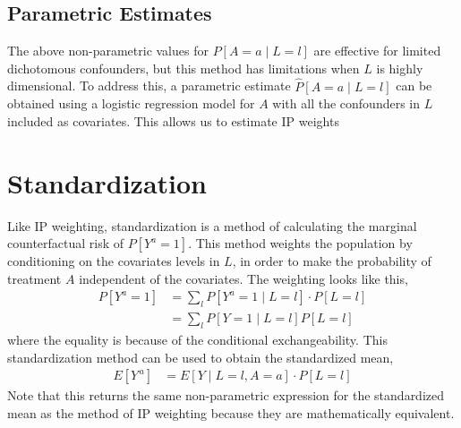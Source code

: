 \subsection{Parametric Estimates} 
The above non-parametric values for $P[A=a\mid L=l]$ are effective for limited dichotomous confounders, but this method has limitations when $L$ is highly dimensional.  To address this, a parametric estimate $\widehat{P}[A=a\mid L=l]$ can be obtained using a logistic regression model for $A$ with all the confounders in $L$ included as covariates.  This allows us to estimate IP weights 

\section{Standardization} \label{Standardization} 
Like IP weighting, standardization is a method of calculating the marginal counterfactual risk of $P[Y^a = 1]$.  This method weights the population by  conditioning on the covariates levels in $L$, in order to make the probability of treatment $A$ independent of the covariates.  The weighting looks like this, 
\begin{align} 
P[Y^a = 1] &= \sum_l P[Y^a = 1 \mid L=l] \cdot P[L = l] \\ 
&= \sum_l P[Y = 1 \mid L=l] P[L = l]  
\end{align} 
where the equality is because of the conditional exchangeability.  This standardization method can be used to obtain the standardized mean, 
\begin{align} 
E[Y^{\,a}] &= E[Y \mid L = l, A =a ] \cdot P[L=l] 
\end{align} 
Note that this returns the same non-parametric expression for the standardized mean as the method of IP weighting because they are mathematically equivalent.  
